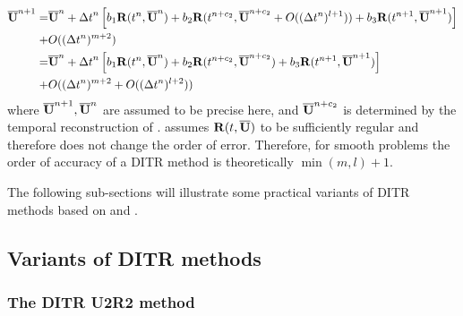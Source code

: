 \begin{equation}
    \begin{aligned}
        \overline{\mathbf{U}}^{n+1} = & \overline{\mathbf{U}}^{n} + {{\Delta} t}^{n}
        \left[
            b_1\mathbf{R}(t^n, \overline{\mathbf{U}}^n)
            +
            b_2\mathbf{R}(t^{n+c_2}, \overline{\mathbf{U}}^{n+c_2} + O(({\Delta} t^{n})^{l+1} ))
            +
            b_3\mathbf{R}(t^{n+1}, \overline{\mathbf{U}}^{n+1})
            \right]
        \\ + &
        O(({\Delta} t^{n})^{m+2} )               \\
        =           &
        \overline{\mathbf{U}}^{n} + {{\Delta} t}^{n}
        \left[
            b_1\mathbf{R}(t^n, \overline{\mathbf{U}}^n)
            +
            b_2\mathbf{R}(t^{n+c_2}, \overline{\mathbf{U}}^{n+c_2})
            +
            b_3\mathbf{R}(t^{n+1}, \overline{\mathbf{U}}^{n+1})
            \right]
        \\ + &
        O(({\Delta} t^{n})^{m+2}  + O(({\Delta} t^{n})^{l+2} ))
    \end{aligned}
    \label{eq:fullLTE}
\end{equation}
where $\overline{\mathbf{U}}^{n+1}, \overline{\mathbf{U}}^{n}$ are assumed to be precise here, and
$\overline{\mathbf{U}}^{n+c_2}$ is determined by the temporal reconstruction of .
 assumes
$\mathbf{R}(t, \overline{\mathbf{U}})$ to be sufficiently regular and therefore does not
change the order of error.
Therefore, for smooth problems the
order of accuracy of a DITR
method is theoretically $\min(m,l) + 1$.

The following sub-sections will illustrate some
practical variants of DITR methods based on  and .


\subsection{Variants of DITR methods}

\subsubsection{The DITR U2R2 method}

